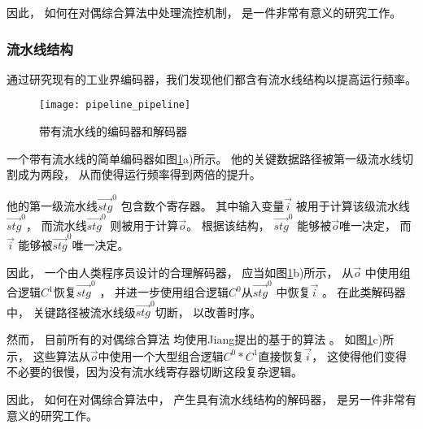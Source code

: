 因此，
如何在对偶综合算法中处理流控机制，
是一件非常有意义的研究工作。

\subsubsection{流水线结构}

通过研究现有的工业界编码器，我们发现他们都含有流水线结构以提高运行频率。
\begin{figure}[b]
\begin{center}
\texttt{[image: pipeline\_pipeline]}
\end{center}
\caption{带有流水线的编码器和解码器}
  \label{fig_pipe_chap1}
\end{figure}

一个带有流水线的简单编码器如图\ref{fig_pipe_chap1}a)所示。
他的关键数据路径被第一级流水线切割成为两段，
从而使得运行频率得到两倍的提升。

他的第一级流水线$\vec{stg}^0$ 包含数个寄存器。
其中输入变量$\vec{i}$ 被用于计算该级流水线$\vec{stg}^0$，
而流水线$\vec{stg}^0$ 则被用于计算$\vec{o}$。
根据该结构，
$\vec{stg}^0$ 能够被$\vec{o}$唯一决定，
而$\vec{i}$ 能够被$\vec{stg}^0$唯一决定。

因此，
一个由人类程序员设计的合理解码器，
应当如图\ref{fig_pipe_chap1}b)所示，
从$\vec{o}$ 中使用组合逻辑$C^1$恢复$\vec{stg}^0$ ，
并进一步使用组合逻辑$C^0$从$\vec{stg}^0$ 中恢复$\vec{i}$ 。
在此类解码器中，
关键路径被流水线级$\vec{stg}^0$切断，
以改善时序。

然而，
目前所有的对偶综合算法
均使用Jiang提出的基于的算法 。
如图\ref{fig_pipe_chap1}c)所示，
这些算法从$\vec{o}$中使用一个大型组合逻辑$C^0*C^1$直接恢复$\vec{i}$，
这使得他们变得不必要的很慢，因为没有流水线寄存器切断这段复杂逻辑。

因此，
如何在对偶综合算法中，
产生具有流水线结构的解码器，
是另一件非常有意义的研究工作。


%
%
%
%
%
%



